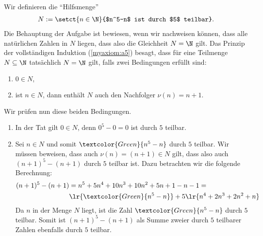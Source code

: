 \begin{myanswer}[myexercise:0299]
	Wir definieren die \enquote{Hilfsmenge}
	\begin{align*}
		N:=\setct{n\in\N}{$n^5-n$ ist durch $5$ teilbar}.
	\end{align*}
	Die Behauptung der Aufgabe ist bewiesen, wenn wir nachweisen können, dass alle natürlichen Zahlen in $N$ liegen, dass also die Gleichheit $N=\N$ gilt. Das Prinzip der vollständigen Induktion (\cref{myaxiom:a5}) besagt, dass für eine Teilmenge $N\subseteq\N$ tatsächlich $N=\N$ gilt, falls zwei Bedingungen erfüllt sind:
	\begin{enumerate}
		\item $0\in N$,
		\item ist $n\in N$, dann enthält $N$ auch den Nachfolger $\nu(n) = n+1$.
	\end{enumerate}
	Wir prüfen nun diese beiden Bedingungen.
	\begin{enumerate}
		\item In der Tat gilt $0\in N$, denn $0^5-0 = 0$ ist durch $5$ teilbar. \checkmark
		\item Sei $n\in N$ und somit $\textcolor{Green}{n^5-n}$ durch $5$ teilbar. Wir müssen beweisen, dass auch $\nu(n)=(n+1)\in N$ gilt, dass also auch $(n+1)^5-(n+1)$ durch $5$ teilbar ist. Dazu betrachten wir die folgende Berechnung:
		      \begin{align*}
			      (n+1)^5-(n+1) & = n^5+5n^4+10n^3+10n^2+5n+1-n-1 =                     \\
			                    & \lr{\textcolor{Green}{n^5-n}} + 5\lr{n^4+2n^3+2n^2+n}
		      \end{align*}
		      Da $n$ in der Menge $N$ liegt, ist die Zahl $\textcolor{Green}{n^5-n}$ durch $5$ teilbar. Somit ist $(n+1)^5-(n+1)$ als Summe zweier durch $5$ teilbarer Zahlen ebenfalls durch $5$ teilbar. \checkmark
	\end{enumerate}
\end{myanswer}

